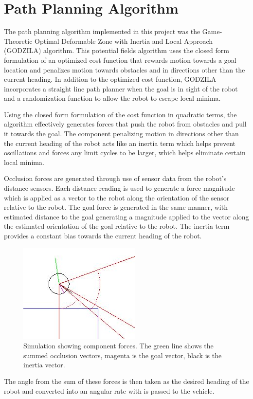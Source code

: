 \chapter{Path Planning Algorithm}

The path planning algorithm implemented in this project was the Game-Theoretic Optimal Deformable Zone with Inertia and Local Approach (GODZILA) algorithm. This potential fields algorithm uses the closed form formulation of an optimized cost function that rewards motion towards a goal location and penalizes motion towards obstacles and in directions other than the current heading. In addition to the optimized cost function, GODZILA incorporates a straight line path planner when the goal is in sight of the robot and a randomization function to allow the robot to escape local minima.

Using the closed form formulation of the cost function in quadratic terms, the algorithm effectively generates forces that push the robot from obstacles and pull it towards the goal. The component penalizing motion in directions other than the current heading of the robot acts like an inertia term which helps prevent oscillations and forces any limit cycles to be larger, which helps eliminate certain local minima.

Occlusion forces are generated through use of sensor data from the robot's distance sensors. Each distance reading is used to generate a force magnitude which is applied as a vector to the robot along the orientation of the sensor relative to the robot.
The goal force is generated in the same manner, with estimated distance to the goal generating a magnitude applied to the vector along the estimated orientation of the goal relative to the robot. The inertia term provides a constant bias towards the current heading of the robot. 

\begin{figure}[h]
	\centering
	\includegraphics{force_sim1.jpg}
	\caption[Simulation showing component forces.]
	{Simulation showing component forces. The green line shows the summed occlusion vectors, magenta is the goal vector,
	 black is the inertia vector.}
	\label{fig:forceSim1}
\end{figure}

The angle from the sum of these forces is then taken as the desired heading of the robot and converted into an angular rate with is passed to the vehicle.